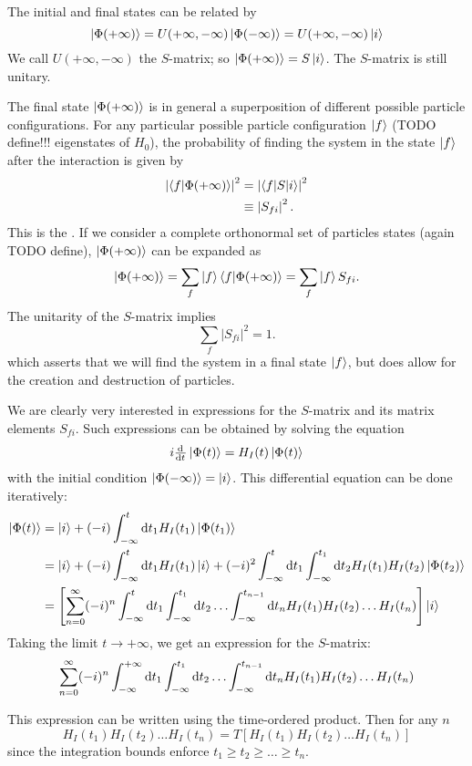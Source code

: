 The initial and final states can be related by
\[ \left| \Phi(+\infty) \right\rangle = U(+\infty, -\infty)\left| \Phi(-\infty) \right\rangle = U(+\infty, -\infty)\left| i \right\rangle \]
We call $U(+\infty, -\infty)$ the $S$-matrix; so $\left| \Phi(+\infty) \right\rangle = S\left| i \right\rangle$. The $S$-matrix is still unitary.

The final state $\left| \Phi(+\infty) \right\rangle$ is in general a superposition of different possible particle configurations. For any particular possible particle configuration $\left| f \right\rangle$ (TODO define!!! eigenstates of $H_0$), the probability of finding the system in the state $\left| f \right\rangle$ after the interaction is given by
\begin{align*}
\left|\braket{f}{\Phi(+\infty)}\right|^2 &= \left|\braket[S]{f}{i}\right|^2 \\
&\equiv \left|S_{fi}\right|^2.
\end{align*}
This is the . If we consider a complete orthonormal set of particles states (again TODO define), $\left| \Phi(+\infty) \right\rangle$ can be expanded as
\[ \ket{\Phi(+\infty)} = \sum_f \ket{f}\braket{f}{\Phi(+\infty)} = \sum_f \ket{f}S_{fi}. \]
The unitarity of the $S$-matrix implies
\[ \sum_f \left|S_{fi}\right|^2 = 1. \]
which asserts that we will find the system in a final state $\left| f \right\rangle$, but does allow for the creation and destruction of particles.

We are clearly very interested in expressions for the $S$-matrix and its matrix elements $S_{fi}$. Such expressions can be obtained by solving the equation
\[ i \od{}{t}\ket{\Phi(t)} = H_I(t) \ket{\Phi(t)} \]
with the initial condition $\left| \Phi(-\infty) \right\rangle = \left| i \right\rangle$. This differential equation can be done iteratively:
\begin{align*}
\left| \Phi(t) \right\rangle &= \left| i \right\rangle + (-i)\int^t_{-\infty}\operatorname{d \!}{t_1}H_I(t_1)\left| \Phi(t_1) \right\rangle \\
&= \left| i \right\rangle + (-i)\int^t_{-\infty}\operatorname{d \!}{t_1}H_I(t_1)\left| i \right\rangle +(-i)^2\int^t_{-\infty}\operatorname{d \!}{t_1}\int^{t_1}_{-\infty}\operatorname{d \!}{t_2}H_I(t_1)H_I(t_2)\left| \Phi(t_2) \right\rangle \\
&= \left[\sum_{n=0}^\infty (-i)^n \int^t_{-\infty}\operatorname{d \!}{t_1}\int_{-\infty}^{t_1}\operatorname{d \!}{t_2} \ldots \int_{-\infty}^{t_{n-1}}\operatorname{d \!}{t_n}H_I(t_1)H_I(t_2)\ldots H_I(t_n)\right]\left| i \right\rangle
\end{align*}
Taking the limit $t\to+\infty$, we get an expression for the $S$-matrix:
\[ \sum_{n=0}^\infty (-i)^n \int^{+\infty}_{-\infty}\operatorname{d \!}{t_1}\int_{-\infty}^{t_1}\operatorname{d \!}{t_2} \ldots \int_{-\infty}^{t_{n-1}}\operatorname{d \!}{t_n}H_I(t_1)H_I(t_2)\ldots H_I(t_n) \]

This expression can be written using the time-ordered product. Then for any $n$
\[ H_I(t_1)H_I(t_2)\ldots H_I(t_n) = T\left[H_I(t_1)H_I(t_2)\ldots H_I(t_n)\right] \]
since the integration bounds enforce $t_1\geq t_2 \geq \ldots \geq t_n$.

